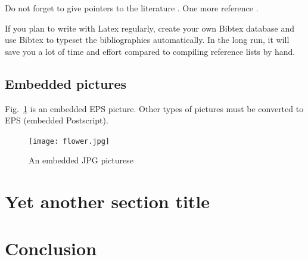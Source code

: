 \documentclass[a4paper,12pt]{article}
\begin{document}
Do not forget to give pointers to the literature
\cite{DifHel76,HarCar98,AbaNee94}.  One more reference
\cite{Amoroso94}.

If you plan to write with Latex regularly, create your own Bibtex
database and use Bibtex to typeset the bibliographies automatically.
In the long run, it will save you a lot of time and effort compared to
compiling reference lists by hand.




\subsection{Embedded pictures}\label{sec:pictures}

Fig.~\ref{fig:mypicture1} is an embedded EPS picture. Other types of
pictures must be converted to EPS (embedded Postscript).

\begin{figure}[t]
  \begin{center}
    \texttt{[image: flower.jpg]}
    \caption{An embedded JPG picturese }
    \label{fig:mypicture1}
  \end{center}
\end{figure}





\pagebreak[3]
\section{Yet another section title}




\pagebreak[3]
\section{Conclusion}



\clearpage
\end{document}
